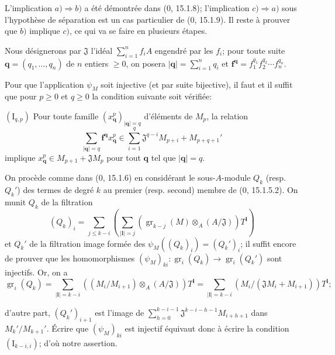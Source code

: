 L'implication $a)\Rightarrow b)$ a été démontrée dans ($0$, 15.1.8); l'implication $c)\Rightarrow a)$ sous l'hypothèse de séparation est un cas particulier de ($0$, 15.1.9). Il reste à prouver que $b)$ implique $c)$, ce qui va se faire en plusieurs étapes.

Nous désignerons par $\mathfrak J$ l'idéal $\sum_{i=1}^n f_iA$ engendré par les $f_i$; pour toute suite $\mathbf q=(q_1,\ldots,q_n)$ de $n$ entiers $\geq0$, on posera $|\mathbf q|=\sum_{i=1}^nq_i$ et $\mathbf f^{\mathbf q}=f_1^{q_1}f_2^{q_2}\cdots f_n^{q_n}$.

\begin{env}[19.5.5.1]
\label{IV.19.5.5.1}
Pour que l'application $\psi_M$ soit injective (et par suite bijective), il faut et il suffit que pour $p\geq0$ et $q\geq0$ la condition suivante soit vérifiée:

$(\mathrm I_{q,p})$ Pour toute famille $(x_{\mathbf q}^p)_{|\mathbf q|=q}$ d'éléments de $M_p$, la relation
\[
  \sum_{|\mathbf q|=q}\mathbf f^{\mathbf q}x_{\mathbf q}^p\in\sum_{i=1}^q\mathfrak J^{q-i}M_{p+i}+M_{p+q+1}'
\]
implique $x_{\mathbf q}^p\in M_{p+1}+\mathfrak JM_p$ pour tout $\mathbf q$ tel que $|\mathbf q|=q$.

On procède comme dans ($0$, 15.1.6) en considérant le sous-$A$-module $Q_k$ (resp. $Q_k'$) des termes de degré $k$ au premier (resp. second) membre de ($0$, 15.1.5.2). On munit $Q_k$ de la filtration
\[
  (Q_k)_i=\sum_{j\leq k-i}\left(\sum_{|\mathbf l|=j}(\operatorname{gr}_{k-j}(M)\otimes_A(A/\mathfrak J))T^{\mathbf l}\right)
\]
et $Q_k'$ de la filtration image formée des $\psi_M((Q_k)_i)=(Q_k')_i$; il suffit encore de prouver que les homomorphismes $(\psi_M)_{ki}:\operatorname{gr}_i(Q_k)\to\operatorname{gr}_i(Q_k')$ sont injectifs. Or, on a
\[
  \operatorname{gr}_i(Q_k)=\sum_{|\mathbf l|=k-i}((M_i/M_{i+1})\otimes_A(A/\mathfrak J))T^{\mathbf l}
  =\sum_{|\mathbf l|=k-i}(M_i/(\mathfrak JM_i+M_{i+1}))T^{\mathbf l};
\]


d'autre part, $(Q_k')_{i+1}$ est l'image de $\sum_{h=0}^{k-i-1}\mathfrak J^{k-i-h-1}M_{i+h+1}$ dans $M_k'/M_{k+1}'$. Écrire que $(\psi_M)_{ki}$ est injectif équivaut donc à écrire la condition $(\mathrm I_{k-i,i})$; d'où notre assertion.
\end{env}

